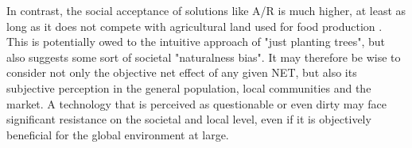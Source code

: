 In contrast, the social acceptance of solutions like A/R is much higher, at least as long as it does not compete with agricultural land used for food production \parencite{schirmer_assessing_2014}. This is potentially owed to the intuitive approach of "just planting trees", but also suggests some sort of societal "naturalness bias". It may therefore be wise to consider not only the objective net effect of any given NET, but also its subjective perception in the general population, local communities and the market. A technology that is perceived as questionable or even dirty may face significant resistance on the societal and local level, even if it is objectively beneficial for the global environment at large.

\begin{table}[]
\caption{Cost, potential, and limitations of selected NETs}
\end{table}